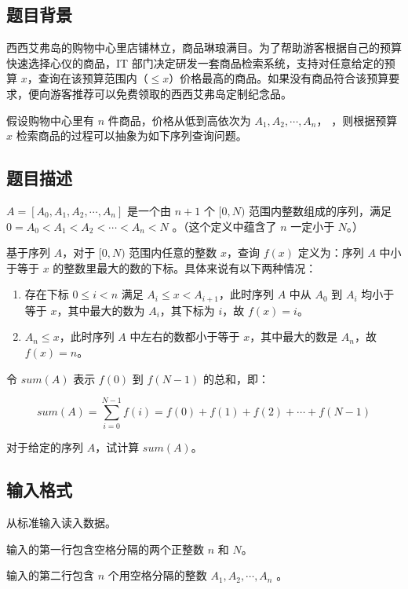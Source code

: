 \subsection*{题目背景}

西西艾弗岛的购物中心里店铺林立，商品琳琅满目。为了帮助游客根据自己的预算快速选择心仪的商品，IT 部门决定研发一套商品检索系统，支持对任意给定的预算 $x$，查询在该预算范围内（$\le x$）价格最高的商品。如果没有商品符合该预算要求，便向游客推荐可以免费领取的西西艾弗岛定制纪念品。

假设购物中心里有 $n$ 件商品，价格从低到高依次为 $A_1,A_2,\cdots, A_n$，
，则根据预算 $x$ 检索商品的过程可以抽象为如下序列查询问题。

\subsection*{题目描述}

$A=[A_0,A_1,A_2,\cdots,A_n]$ 是一个由 $n+1$ 个 $[0,N)$ 范围内整数组成的序列，满足 $0=A_0<A_1<A_2<\cdots<A_n<N$
。（这个定义中蕴含了 $n$ 一定小于 $N$。）

基于序列 $A$，对于 $[0,N)$ 范围内任意的整数 $x$，查询 $f(x)$ 定义为：序列 $A$ 中{\heiti 小于等于} $x$ 的整数里最大的数的{\heiti 下标}。具体来说有以下两种情况：

\begin{enumerate}
    \item 存在下标 $0\le i<n$ 满足 $A_i\le x < A_{i+1}$，此时序列 $A$ 中从 $A_0$ 到 $A_i$ 均小于等于 $x$，其中最大的数为 $A_i$，其下标为 $i$，故 $f(x)=i$。
    \item $A_n\le x$，此时序列 $A$ 中左右的数都小于等于 $x$，其中最大的数是 $A_n$，故 $f(x)=n$。
\end{enumerate}

令 $sum(A)$ 表示 $f(0)$ 到 $f(N-1)$ 的总和，即：

\begin{equation*}
    sum(A) = \sum_{i=0}^{N-1} {f(i)=f(0)+f(1)+f(2)+\cdots +f(N-1)}
\end{equation*}

对于给定的序列 $A$，试计算 $sum(A)$。

\subsection*{输入格式}

从标准输入读入数据。

输入的第一行包含空格分隔的两个正整数 $n$ 和 $N$。

输入的第二行包含 $n$ 个用空格分隔的整数 $A_1,A_2,\cdots,A_n$
。

